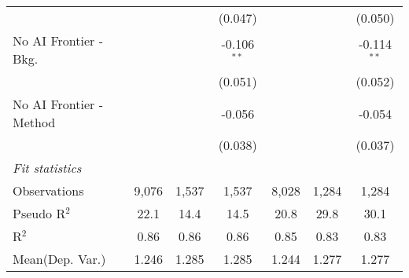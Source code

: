 \begin{tabular}{lcccccc}
                           &         &              & (0.047)       &         &              & (0.050)\\   
   No AI Frontier - Bkg.   &         &              & -0.106$^{**}$ &         &              & -0.114$^{**}$\\   
                           &         &              & (0.051)       &         &              & (0.052)\\   
   No AI Frontier - Method &         &              & -0.056        &         &              & -0.054\\   
                           &         &              & (0.038)       &         &              & (0.037)\\   
   \midrule
   \emph{Fit statistics}\\
   Observations            & 9,076   & 1,537        & 1,537         & 8,028   & 1,284        & 1,284\\  
   Pseudo R$^2$            & 22.1    & 14.4         & 14.5          & 20.8    & 29.8         & 30.1\\  
   R$^2$                   & 0.86    & 0.86         & 0.86          & 0.85    & 0.83         & 0.83\\  
Mean(Dep. Var.) & 1.246 & 1.285 & 1.285 & 1.244 & 1.277 & 1.277 \\
   

\end{tabular}
